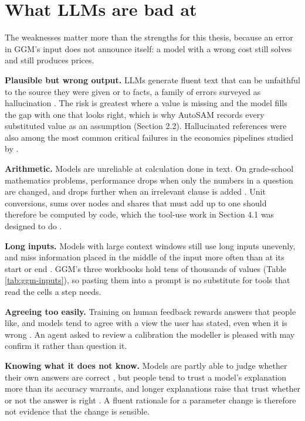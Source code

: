 \section{What LLMs are bad at}

The weaknesses matter more than the strengths for this thesis, because an error in GGM's input does not announce itself: a model with a wrong cost still solves and still produces prices.

\textbf{Plausible but wrong output.} LLMs generate fluent text that can be unfaithful to the source they were given or to facts, a family of errors surveyed as hallucination \citep{huang2025survey}.
The risk is greatest where a value is missing and the model fills the gap with one that looks right, which is why AutoSAM records every substituted value as an assumption (Section 2.2).
Hallucinated references were also among the most common critical failures in the economics pipelines studied by \citet{zhu2026human}.

\textbf{Arithmetic.} Models are unreliable at calculation done in text.
On grade-school mathematics problems, performance drops when only the numbers in a question are changed, and drops further when an irrelevant clause is added \citep{mirzadeh2024gsm}.
Unit conversions, sums over nodes and shares that must add up to one should therefore be computed by code, which the tool-use work in Section 4.1 was designed to do \citep{gao2022pal}.

\textbf{Long inputs.} Models with large context windows still use long inputs unevenly, and miss information placed in the middle of the input more often than at its start or end \citep{liu2024lost}.
GGM's three workbooks hold tens of thousands of values (Table \ref{tab:ggm-inputs}), so pasting them into a prompt is no substitute for tools that read the cells a step needs.

\textbf{Agreeing too easily.} Training on human feedback rewards answers that people like, and models tend to agree with a view the user has stated, even when it is wrong \citep{sharma2023towards}.
An agent asked to review a calibration the modeller is pleased with may confirm it rather than question it.

\textbf{Knowing what it does not know.} Models are partly able to judge whether their own answers are correct \citep{kadavath2022language}, but people tend to trust a model's explanation more than its accuracy warrants, and longer explanations raise that trust whether or not the answer is right \citep{steyvers2025large}.
A fluent rationale for a parameter change is therefore not evidence that the change is sensible.

